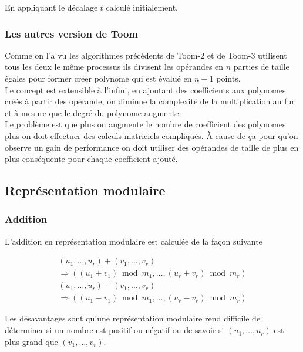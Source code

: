 \documentclass[letterpaper]{article}
\begin{document}
En appliquant le décalage $t$ calculé initialement.

\subsubsection{Les autres version de Toom}

Comme on l'a vu les algorithmes précédents de Toom-2 et de Toom-3 utilisent
tous les deux le même processus ils divisent les opérandes en $n$ parties
de taille égales pour former créer polynome qui est évalué en $n - 1$
points.\\
Le concept est extensible à l'infini, en ajoutant des coefficients aux
polynomes créés à partir des opérande, on diminue la complexité de la
multiplication au fur et à mesure que le degré du polynome augmente.\\
Le problème est que plus on augmente le nombre de coefficient des polynomes
plus on doit effectuer des calculs matriciels compliqués. À cause de ça pour
qu'on observe un gain de performance on doit utiliser des opérandes de taille
de plus en plus conséquente pour chaque coefficient ajouté.

\subsection{Représentation modulaire}

\subsubsection{Addition}

L'addition en représentation modulaire est calculée de la façon suivante

\begin{equation}
  \begin{split}
    (u_1, \dots, u_r) + (v_1, \dots, v_r) \\
     \Rightarrow ((u_1 + v_1) \bmod m_1, \dots, (u_r + v_r) \bmod m_r)
  \end{split}
\end{equation}
\begin{equation}
  \begin{split}
    (u_1, \dots, u_r) - (v_1, \dots, v_r) \\
      \Rightarrow ((u_1 - v_1) \bmod m_1, \dots, (u_r - v_r) \bmod m_r)
  \end{split}
\end{equation}

Les désavantages sont qu'une représentation modulaire rend difficile de
déterminer si un nombre est positif ou négatif ou de savoir si
$(u_1, \dots, u_r)$ est plus grand que $(v_1, \dots, v_r)$.
\end{document}
